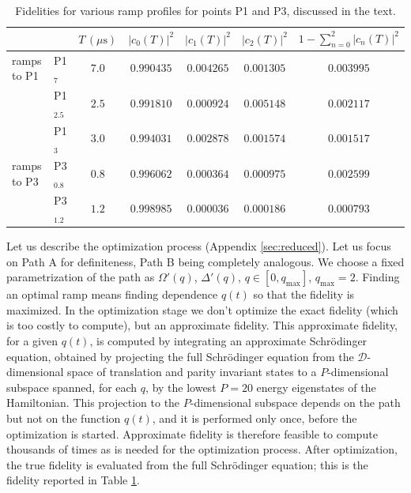 \documentclass[a4paper,12pt]{article}
\theoremstyle{remark}
\theoremstyle{theorem}
\begin{document}
\begin{table}[h]\centering
\begin{tabular}{llccccc}
	\toprule
	& 
	& $T\,(\mu\mathrm{s})$
	& $|c_0(T)|^2$
	& $|c_1(T)|^2$
	& $|c_2(T)|^2$
	& $1-\displaystyle\sum_{n=0}^{2}|c_n(T)|^2$ \\
	\midrule
	ramps to P1 & P1$_7$ \cite{Fang:2024uyf} & $7.0$ & $0.990435$ & $0.004265$ & $0.001305$ & $0.003995$ \\
	& P1$_{2.5}$ & $2.5$ & $0.991810$ & $0.000924$ & $0.005148$ & $0.002117$ \\
	& P1$_3$ & $3.0$ & $0.994031$ & $0.002878$ & $0.001574$ & $0.001517$ \\
	\midrule
	ramps to P3 & P3$_{0.8}$ & $0.8$ & $0.996062$ & $0.000364$ & $0.000975$ & $0.002599$ \\
	& P3$_{1.2}$ & $1.2$ & $0.998985$ & $0.000036$ & $0.000186$ & $0.000793$ \\
	\bottomrule
	\end{tabular}
\caption{\label{tab:fidel}Fidelities for various ramp profiles for points P1 and P3, discussed in the text.}
\end{table}
Let us describe the optimization process (Appendix \ref{sec:reduced}). Let us focus on Path A for definiteness, Path B being completely analogous. We choose a fixed parametrization of the path as $\Omega'(q)$, $\Delta'(q)$, $q\in [0,q_{\max}]$, $q_{\max}=2$. Finding an optimal ramp means finding dependence $q(t)$ so that the fidelity is maximized. In the optimization stage we don't optimize the exact fidelity (which is too costly to compute), but an approximate fidelity. This approximate fidelity, for a given $q(t)$, is computed by integrating an approximate Schr\"odinger equation, obtained by projecting the full Schr\"odinger equation from the $\mathcal{D}$-dimensional space of translation and parity invariant states to a $P$-dimensional subspace spanned, for each $q$, by the lowest $P=20$ energy eigenstates of the Hamiltonian. This projection to the $P$-dimensional subspace depends on the path but not on the function $q(t)$, and it is performed only once, before the optimization is started. Approximate fidelity is therefore feasible to compute thousands of times as is needed for the optimization process. After optimization, the true fidelity is evaluated from the full Schr\"odinger equation; this is the fidelity reported in Table \ref{tab:fidel}.
\end{document}
